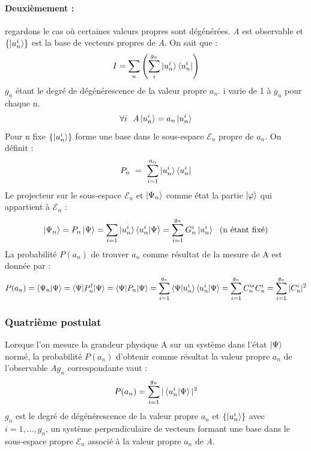 \documentclass[12pt,a4paper,titlepage]{book}
\begin{document}
\paragraph*{Deuxièmement :}

regardons le cas où certaines valeurs propres sont dégénérées. \textit{A} est observable et $\lbrace \ket{u_n^i} \rbrace$ est la base de vecteurs propres de \textit{A}. On sait que :
\begin{equation*}
I = \sum\limits_n \left( \sum_i^{g_n} \ket{u_n^i} \bra{u_n^i} \right)
\end{equation*}
$g_n$ étant le degré de dégénérescence de la valeur propre $a_n$. i varie de 1 à $g_n$ pour chaque n.
\begin{equation*}
\forall i ~~ A \ket{u_n^i} = a_n \ket{u_n^i}
\end{equation*}
Pour n fixe $\lbrace \ket{u_n^i} \rbrace$ forme une base dans le sous-espace $\mathcal{E}_n$ propre de $a_n$. On définit :
\begin{equation*}
P_n ~=~ \sum\limits_{i=1}^{a_n} \ket{u_n^i} \bra{u_n^i}
\end{equation*}
Le projecteur sur le sous-espace $\mathcal{E}_n$ et $\ket{\Psi_n}$ comme état la partie $\ket\varphi$ qui appartient à $\mathcal{E}_n$ :
\begin{equation*}
\ket{\Psi_n} = P_n \ket\Psi = \sum\limits_{i=1} \ket{u_n^i} \braket{u_n^i | \Psi} = \sum\limits_{i=1}^{g_n} G_n^i \ket{u_n^i} ~~\text{(n étant fixé)}
\end{equation*}
La probabilité $P(a_n)$ de trouver $a_n$ comme résultat de la mesure de A est donnée par :
\begin{equation*}
P(a_n) = \braket{\Psi_n | \Psi} = \braket{\Psi | P_n^\dagger | \Psi} = \braket{\Psi | P_n | \Psi} = \sum\limits_{i=1}^{g_n} \braket{\Psi | u_n^i} \braket{u_n^i | \Psi} = \sum\limits_{i=1}^{g_n} C_n^{i\mathsf{x}} C_n^i = \sum\limits_{i=1}^{g_n} \vert C_n^i \vert^2
\end{equation*}

\subsubsection{Quatrième postulat}
Lorsque l'on mesure la grandeur physique A sur un système dans l'état $\ket\Psi$ normé, la probabilité $P(a_n)$ d'obtenir comme résultat la valeur propre $a_n$ de l'observable $A g_n$ correspondante vaut :
\begin{equation*}
P(a_n) = \sum\limits_{i=1}^{g_n} \vert \braket{u_n^i | \Psi} \vert^2
\end{equation*}
$g_n$ est le degré de dégénérescence de la valeur propre $a_n$ et $\lbrace \ket{u_n^i} \rbrace$ avec $i = 1, \ldots, g_n$, un système perpendiculaire de vecteurs formant une base dans le sous-espace propre $\mathcal{E}_n$ associé à la valeur propre $a_n$ de \textit{A}.
\end{document}
